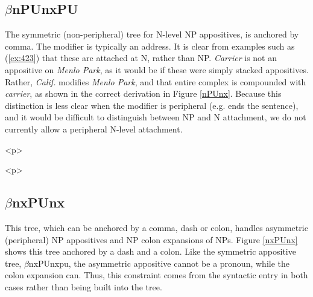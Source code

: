  
\subsection{$\beta$nPUnxPU} 
 
The symmetric (non-peripheral) tree for N-level NP appositives, is 
anchored by comma. The modifier is typically an address.  It is clear 
from examples such as (\ref{ex:423}) that these are attached at N, rather 
than NP. {\it Carrier } is not an appositive on {\it Menlo Park}, as it 
would be if these were simply stacked appositives. Rather, {\it Calif.} modifies {\it Menlo Park}, and that entire complex is 
compounded with {\it carrier}, as shown in the correct derivation in 
Figure \ref{nPUnx}. Because this distinction is less clear when the 
modifier is peripheral (e.g. ends the sentence), and it would be 
difficult to distinguish between NP and N attachment, we do not 
currently allow a peripheral N-level attachment. 
 
\beginsentences
{}\label{ex:423} 
\label{ex:424} 
\endsentences

 
\begin{rawhtml} <p> \end{rawhtml}
\centering 
\hspace{0.0in} 
\begin{rawhtml} <dl> <dt>{An N-level modifier, using the $\beta$nPUnx tree <p> </dl> \end{rawhtml}
\label{nPUnx} 
\begin{rawhtml} <p> \end{rawhtml}
 
\subsection{$\beta$nxPUnx} 
 
This tree, which can be anchored by a comma, dash or colon, handles 
asymmetric (peripheral) NP appositives and NP colon expansions of 
NPs. Figure \ref{nxPUnx} shows this tree anchored by a dash and a 
colon. Like the symmetric appositive tree, $\beta$nxPUnxpu, the 
asymmetric appositive cannot be a pronoun, while the colon expansion 
can. Thus, this constraint comes from the syntactic entry in both 
cases rather than being built into the tree. 
 
